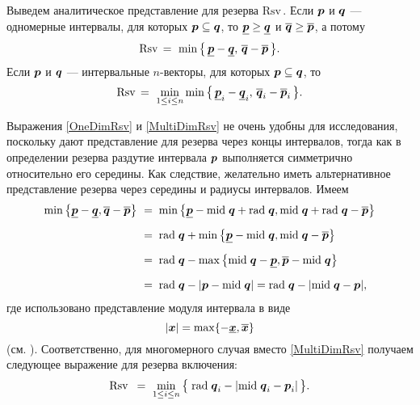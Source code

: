 \documentclass[a5paper,openany]{book}
\newcommand{\mbf}[1]{\protect\text{\boldmath$#1$}}
\newcommand{\ov}{\overline}
\newcommand{\un}{\underline}
\newcommand{\m}{\mathrm{mid}\;}
\newcommand{\Rsv}{\mathrm{Rsv}\,}
\renewcommand{\r}{\mathrm{rad}\;}
\begin{document}
Выведем аналитическое представление для резерва $\Rsv$. Если $\mbf{p}$ и $\mbf{q}$ --- 
одномерные интервалы, для которых  $\mbf{p}\subseteq\mbf{q}$, то $\un{\mbf{p}} \geq 
\un{\mbf{q}}$ и $\ov{\mbf{q}} \geq \ov{\mbf{p}}$, а потому  
\begin{equation} 
\label{OneDimRsv} 
\Rsv = \  \min\,\bigl\{\,\un{\mbf{p}} - \un{\mbf{q}}, \,\ov{\mbf{q}} - \ov{\mbf{p}}\,\bigr\}. 
\end{equation} 
Если $\mbf{p}$ и $\mbf{q}$ --- интервальные $n$-векторы, для которых $\mbf{p}\subseteq
\mbf{q}$, то 
\begin{equation} 
\label{MultiDimRsv}
\Rsv = \   \min_{1\leq i\leq n} 
           \min\,\bigl\{\,\un{\mbf{p}}_{i} - \un{\mbf{q}}_{i}, \, 
                          \ov{\mbf{q}}_{i} - \ov{\mbf{p}}_{i}\,\bigr\}. 
\end{equation} 
  
Выражения \eqref{OneDimRsv} и \eqref{MultiDimRsv} не очень удобны для исследования, 
поскольку дают представление для резерва через концы интервалов, тогда как в определении 
резерва раздутие интервала $\mbf{p}$ выполняется симметрично относительно его середины. 
Как следствие, желательно иметь альтернативное представление резерва через середины 
и радиусы интервалов. Имеем 
\begin{align*} 
\min\,\bigl\{\un{\mbf{p}} - \un{\mbf{q}}, \ov{\mbf{q}} - \ov{\mbf{p}}\bigr\} \ 
&=\;\min\,\bigl\{\un{\mbf{p}} - \m\mbf{q} + \r\mbf{q}, 
                             \m\mbf{q} + \r\mbf{q} - \ov{\mbf{p}}\bigr\}               \\[2mm] 
&=\;\r\mbf{q} + \min\,\bigl\{\un{\mbf{p}} - \m\mbf{q}, \m\mbf{q} - \ov{\mbf{p}}\bigr\} \\[2mm] 
&=\;\r\mbf{q} - \max\,\bigl\{\m\mbf{q} - \un{\mbf{p}}, \ov{\mbf{p}} - \m\mbf{q}\bigr\} \\[2mm] 
&=\;\r\mbf{q} - | \mbf{p} - \m\mbf{q}| = \r\mbf{q} - | \m\mbf{q} - \mbf{p}|, 
\end{align*} 
где использовано представление модуля интервала в виде 
\begin{equation*} 
|\mbf{x}| = \max\{ -\un{\mbf{x}}, \ov{\mbf{x}}\} 
\end{equation*} 
(см. \cite{SSharyBook}). Соответственно,  для многомерного случая вместо 
\eqref{MultiDimRsv} получаем следующее выражение для резерва включения: 
\begin{equation*} 
\Rsv \  = \  
   \min_{1\leq i\leq n}\,\bigl\{\; \r\mbf{q}_{i} - |\m\mbf{q}_{i} - \mbf{p}_{i}|\,\bigr\}. 
\end{equation*} 
  
\end{document}
